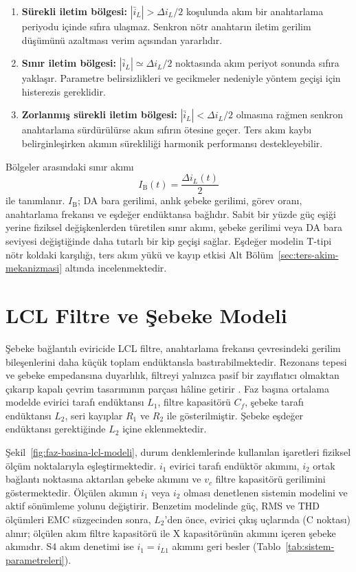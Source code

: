 \begin{enumerate}
  \item \textbf{Sürekli iletim bölgesi:} $|\bar i_L|>\Delta i_L/2$ koşulunda akım bir anahtarlama periyodu içinde sıfıra ulaşmaz. Senkron nötr anahtarın iletim gerilim düşümünü azaltması verim açısından yararlıdır.
  \item \textbf{Sınır iletim bölgesi:} $|\bar i_L|\simeq\Delta i_L/2$ noktasında akım periyot sonunda sıfıra yaklaşır. Parametre belirsizlikleri ve gecikmeler nedeniyle yöntem geçişi için histerezis gereklidir.
  \item \textbf{Zorlanmış sürekli iletim bölgesi:} $|\bar i_L|<\Delta i_L/2$ olmasına rağmen senkron anahtarlama sürdürülürse akım sıfırın ötesine geçer. Ters akım kaybı belirginleşirken akımın sürekliliği harmonik performansı destekleyebilir.
\end{enumerate}

Bölgeler arasındaki sınır akımı
\begin{equation}
  I_{\mathrm{B}}(t)=\frac{\Delta i_L(t)}{2}
  \label{eq:sinir-akimi}
\end{equation}
ile tanımlanır. $I_{\mathrm{B}}$; DA bara gerilimi, anlık şebeke gerilimi, görev oranı, anahtarlama frekansı ve eşdeğer endüktansa bağlıdır. Sabit bir yüzde güç eşiği yerine fiziksel değişkenlerden türetilen sınır akımı, şebeke gerilimi veya DA bara seviyesi değiştiğinde daha tutarlı bir kip geçişi sağlar. Eşdeğer modelin T-tipi nötr koldaki karşılığı, ters akım yükü ve kayıp etkisi Alt Bölüm~\ref{sec:ters-akim-mekanizmasi} altında incelenmektedir.

\section{LCL Filtre ve Şebeke Modeli}

Şebeke bağlantılı eviricide LCL filtre, anahtarlama frekansı çevresindeki gerilim bileşenlerini daha küçük toplam endüktansla bastırabilmektedir. Rezonans tepesi ve şebeke empedansına duyarlılık, filtreyi yalnızca pasif bir zayıflatıcı olmaktan çıkarıp kapalı çevrim tasarımının parçası hâline getirir \citep{Zhang2014PR,Lu2016}. Faz başına ortalama modelde evirici tarafı endüktansı $L_1$, filtre kapasitörü $C_f$, şebeke tarafı endüktansı $L_2$, seri kayıplar $R_1$ ve $R_2$ ile gösterilmiştir. Şebeke eşdeğer endüktansı gerektiğinde $L_2$ içine eklenmektedir.

Şekil~\ref{fig:faz-basina-lcl-modeli}, durum denklemlerinde kullanılan işaretleri fiziksel ölçüm noktalarıyla eşleştirmektedir. $i_1$ evirici tarafı endüktör akımını, $i_2$ ortak bağlantı noktasına aktarılan şebeke akımını ve $v_c$ filtre kapasitörü gerilimini göstermektedir. Ölçülen akımın $i_1$ veya $i_2$ olması denetlenen sistemin modelini ve aktif sönümleme yolunu değiştirir. Benzetim modelinde güç, RMS ve THD ölçümleri EMC süzgecinden sonra, $L_2$'den önce, evirici çıkış uçlarında (C noktası) alınır; ölçülen akım filtre kapasitörü ile X kapasitörünün akımını içeren şebeke akımıdır. S4 akım denetimi ise $i_1=i_{L1}$ akımını geri besler (Tablo~\ref{tab:sistem-parametreleri}).

